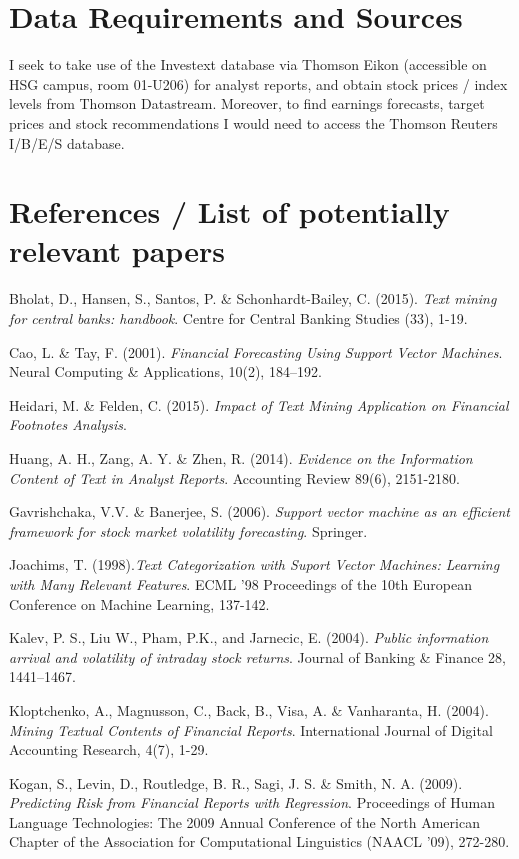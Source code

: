 \documentclass[12pt, a4paper]{article}
\begin{document}
\section*{Data Requirements and Sources}
I seek to take use of the Investext database via Thomson Eikon (accessible on HSG campus, room 01-U206) for analyst reports, and obtain stock prices / index levels from Thomson Datastream. Moreover, to find earnings forecasts, target prices and stock recommendations I would need to access the Thomson Reuters I/B/E/S database.
\newpage
\section*{References / List of potentially relevant papers}
\begin{multicols}{2}
\scriptsize{
Bholat, D., Hansen, S., Santos, P. \& Schonhardt-Bailey, C. (2015). \textit{Text mining for central banks: handbook}. Centre for Central Banking Studies (33),  1-19.

Cao, L. \& Tay, F. (2001). \textit{Financial Forecasting Using Support Vector Machines}. Neural Computing \& Applications, 10(2), 184–192.

Heidari, M. \& Felden, C. (2015). \textit{Impact of Text Mining Application on Financial Footnotes Analysis}. 

Huang, A. H., Zang, A. Y. \& Zhen, R. (2014). \textit{Evidence on the Information Content of Text in Analyst Reports}. Accounting Review 89(6), 2151-2180.

Gavrishchaka, V.V. \& Banerjee, S. (2006). \textit{Support vector machine as an efficient framework for stock market volatility forecasting}. Springer.

Joachims, T. (1998).\textit{Text Categorization with Suport Vector Machines: Learning with Many Relevant Features}. ECML '98 Proceedings of the 10th European Conference on Machine Learning, 137-142.

Kalev, P. S., Liu W., Pham, P.K., and Jarnecic, E. (2004). \textit{Public information arrival and volatility of intraday stock returns}. Journal of Banking \& Finance 28, 1441–1467.

Kloptchenko, A., Magnusson, C., Back, B., Visa, A. \& Vanharanta, H. (2004). \textit{Mining Textual Contents of Financial Reports}. International Journal of Digital Accounting Research, 4(7), 1-29.

Kogan, S., Levin, D., Routledge, B. R., Sagi, J. S. \& Smith, N. A. (2009). \textit{Predicting Risk from Financial Reports with Regression}. Proceedings of Human Language Technologies: The 2009 Annual Conference of the North American Chapter of the Association for Computational Linguistics (NAACL '09), 272-280.

}
\end{multicols}
\end{document}
